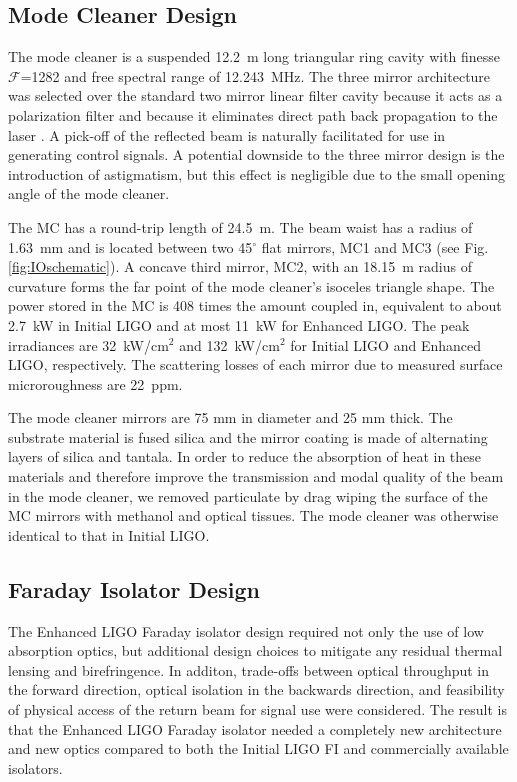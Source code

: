 \subsection{Mode Cleaner Design}
The mode cleaner is a suspended 12.2~m long triangular ring cavity
with finesse $\mathcal{F}$=1282 and free spectral range of
12.243~MHz. The three mirror architecture was selected over the
standard two mirror linear filter cavity because it acts as a
polarization filter and because it eliminates direct path back
propagation to the laser \citep{Raab1992Estimation}. A pick-off of the
reflected beam is naturally facilitated for use in generating control
signals. A potential downside to the three mirror design is the
introduction of astigmatism, but this effect is negligible due to the
small opening angle of the mode cleaner. 

The MC has a round-trip length of 24.5~m. The beam waist has a radius of
1.63~mm and is located between two 45$^\circ$ flat mirrors, MC1 and
MC3 (see Fig. \ref{fig:IOschematic}). A concave third mirror, MC2,
with an 18.15~m radius of curvature forms the far point of the mode
cleaner's isoceles triangle shape. The power stored in the MC is 408
times the amount coupled in, equivalent to about 2.7~kW in Initial
LIGO and at most 11~kW for Enhanced LIGO. The peak irradiances are
32~kW/cm$^2$ and 132~kW/cm$^2$ for Initial LIGO and Enhanced LIGO,
respectively. The scattering losses of each mirror due to measured
surface microroughness are 22~ppm.

The mode cleaner mirrors are 75 mm in diameter and 25 mm thick. The
substrate material is fused silica and the mirror coating is made of
alternating layers of silica and tantala. In order to reduce the
absorption of heat in these materials and therefore improve the
transmission and modal quality of the beam in the mode cleaner, we
removed particulate by drag wiping the surface of the MC mirrors with
methanol and optical tissues. The mode cleaner was otherwise identical
to that in Initial LIGO.



\subsection{Faraday Isolator Design}
The Enhanced LIGO Faraday isolator design required not only the use of
low absorption optics, but additional design choices to mitigate any
residual thermal lensing and birefringence. In additon, trade-offs
between optical throughput in the forward direction, optical isolation
in the backwards direction, and feasibility of physical access of the
return beam for signal use were considered. The result is that the
Enhanced LIGO Faraday isolator needed a completely new architecture
and new optics compared to both the Initial LIGO FI and commercially
available isolators.

